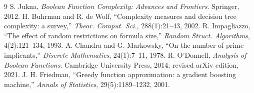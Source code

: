 \documentclass[10pt]{article}
\theoremstyle{definition}
\begin{document}
\begingroup
\footnotesize
\setlength{\parskip}{0pt}
\begin{thebibliography}{9}
\setlength{\itemsep}{0pt}
S. Jukna, \emph{Boolean Function Complexity: Advances and Frontiers}.
Springer, 2012.
H. Buhrman and R. de Wolf, ``Complexity measures and decision tree
complexity: a survey,'' \emph{Theor. Comput. Sci.}, 288(1):21--43, 2002.
R. Impagliazzo, ``The effect of random restrictions on formula size,''
\emph{Random Struct. Algorithms}, 4(2):121--134, 1993.
A. Chandra and G. Markowsky, ``On the number of prime implicants,''
\emph{Discrete Mathematics}, 24(1):7--11, 1978.
R. O'Donnell, \emph{Analysis of Boolean Functions}. Cambridge University
Press, 2014; revised arXiv edition, 2021.
J. H. Friedman, ``Greedy function approximation: a gradient boosting
machine,'' \emph{Annals of Statistics}, 29(5):1189--1232, 2001.
\end{thebibliography}
\endgroup
\end{document}

